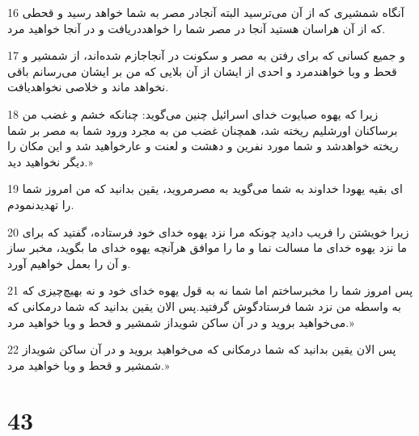 \par 16 آنگاه شمشیری که از آن می‌ترسید البته آنجادر مصر به شما خواهد رسید و قحطی که از آن هراسان هستید آنجا در مصر شما را خواهددریافت و در آنجا خواهید مرد.
\par 17 و جمیع کسانی که برای رفتن به مصر و سکونت در آنجاجازم شده‌اند، از شمشیر و قحط و وبا خواهندمرد و احدی از ایشان از آن بلایی که من بر ایشان می‌رسانم باقی نخواهد ماند و خلاصی نخواهدیافت.
\par 18 زیرا که یهوه صبایوت خدای اسرائیل چنین می‌گوید: چنانکه خشم و غضب من برساکنان اورشلیم ریخته شد، همچنان غضب من به مجرد ورود شما به مصر بر شما ریخته خواهدشد و شما مورد نفرین و دهشت و لعنت و عارخواهید شد و این مکان را دیگر نخواهید دید.»
\par 19 ‌ای بقیه یهودا خداوند به شما می‌گوید به مصرمروید، یقین بدانید که من امروز شما را تهدیدنمودم.
\par 20 زیرا خویشتن را فریب دادید چونکه مرا نزد یهوه خدای خود فرستاده، گفتید که برای ما نزد یهوه خدای ما مسالت نما و ما را موافق هرآنچه یهوه خدای ما بگوید، مخبر ساز و آن را بعمل خواهیم آورد.
\par 21 پس امروز شما را مخبرساختم اما شما نه به قول یهوه خدای خود و نه بهیچ‌چیزی که به واسطه من نزد شما فرستادگوش گرفتید.پس الان یقین بدانید که شما درمکانی که می‌خواهید بروید و در آن ساکن شویداز شمشیر و قحط و وبا خواهید مرد.»
\par 22 پس الان یقین بدانید که شما درمکانی که می‌خواهید بروید و در آن ساکن شویداز شمشیر و قحط و وبا خواهید مرد.»
 
\chapter{43}

